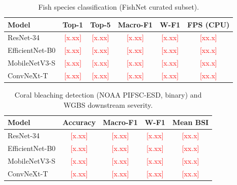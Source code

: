 \documentclass[conference]{IEEEtran}
\newcommand{\tofill}[1]{\textcolor{red}{[#1]}}
\begin{document}
\begin{table}[t]
\centering
\caption{Fish species classification (FishNet curated subset).}
\label{tab:fish_results}
\begin{tabular}{lccccc}
\toprule
Model & Top-1 & Top-5 & Macro-F1 & W-F1 & FPS (CPU) \\
\midrule
ResNet-34 & \tofill{x.xx} & \tofill{x.xx} & \tofill{x.xx} & \tofill{x.xx} & \tofill{xx.x} \\
EfficientNet-B0 & \tofill{x.xx} & \tofill{x.xx} & \tofill{x.xx} & \tofill{x.xx} & \tofill{xx.x} \\
MobileNetV3-S & \tofill{x.xx} & \tofill{x.xx} & \tofill{x.xx} & \tofill{x.xx} & \tofill{xx.x} \\
ConvNeXt-T & \tofill{x.xx} & \tofill{x.xx} & \tofill{x.xx} & \tofill{x.xx} & \tofill{xx.x} \\
\bottomrule
\end{tabular}
\end{table}

\begin{table}[t]
\centering
\caption{Coral bleaching detection (NOAA PIFSC-ESD, binary) and WGBS downstream severity.}
\label{tab:coral_results}
\begin{tabular}{lcccc}
\toprule
Model & Accuracy & Macro-F1 & W-F1 & Mean BSI \\
\midrule
ResNet-34 & \tofill{x.xx} & \tofill{x.xx} & \tofill{x.xx} & \tofill{xx.x} \\
EfficientNet-B0 & \tofill{x.xx} & \tofill{x.xx} & \tofill{x.xx} & \tofill{xx.x} \\
MobileNetV3-S & \tofill{x.xx} & \tofill{x.xx} & \tofill{x.xx} & \tofill{xx.x} \\
ConvNeXt-T & \tofill{x.xx} & \tofill{x.xx} & \tofill{x.xx} & \tofill{xx.x} \\
\bottomrule
\end{tabular}
\end{table}
\end{document}
